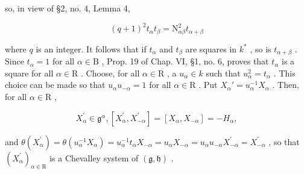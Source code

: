 so, in view of §2, no. 4, Lemma 4,

\[
(q + 1) ^ {2} t _ {\alpha} t _ {\beta} = \mathrm{N} _ {\alpha \beta} ^ {2} t _ {\alpha + \beta}
\]

where \(q\) is an integer. It follows that if \(t_{\alpha}\) and \(t_{\beta}\) are squares in \(k^*\) , so is \(t_{\alpha + \beta}\) . Since \(t_{\alpha} = 1\) for all \(\alpha \in \mathrm{B}\) , Prop. 19 of Chap. VI, §1, no. 6, proves that \(t_{\alpha}\) is a square for all \(\alpha \in \mathrm{R}\) . Choose, for all \(\alpha \in \mathrm{R}\) , a \(u_{\alpha} \in k\) such that \(u_{\alpha}^{2} = t_{\alpha}\) . This choice can be made so that \(u_{\alpha}u_{-\alpha} = 1\) for all \(\alpha \in \mathrm{R}\) . Put \(X_{\alpha}' = u_{\alpha}^{-1}X_{\alpha}\) . Then, for all \(\alpha \in \mathrm{R}\) ,

\[
X _ {\alpha} ^ {\prime} \in \mathfrak {g} ^ {\alpha}, [ X _ {\alpha} ^ {\prime}, X _ {- \alpha} ^ {\prime} ] = [ X _ {\alpha}, X _ {- \alpha} ] = - H _ {\alpha},
\]

and \(\theta(X_{\alpha}^{\prime}) = \theta(u_{\alpha}^{-1}X_{\alpha}) = u_{\alpha}^{-1}t_{\alpha}X_{-\alpha} = u_{\alpha}X_{-\alpha} = u_{\alpha}u_{-\alpha}X_{-\alpha}^{\prime} = X_{-\alpha}^{\prime}\) , so that \((X_{\alpha}^{\prime})_{\alpha \in \mathrm{R}}\) is a Chevalley system of \((\mathfrak{g},\mathfrak{h})\) .

